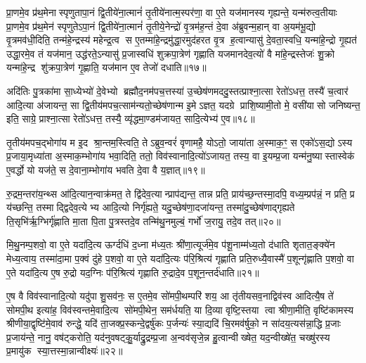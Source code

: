 प्रा॒णमे॒व प्र॑थ॒मेनास्पृणुतापा॒नं द्वि॒तीये॑ना॒त्मानं॑ तृ॒तीये॑नात्म॒स्पर॑णा॒ वा ए॒ते यज॑मानस्य गृह्यन्ते॒ यन्म॑रुत्व॒तीयाः प्रा॒णमे॒व प्र॑थ॒मेन॑ स्पृणुतेऽपा॒नं द्वि॒तीये॑ना॒त्मानं॑ तृ॒तीये॒नेन्द्रो॑ वृ॒त्रम॑ह॒न्तं दे॒वा अ॑ब्रुवन्म॒हान् वा अ॒यम॑भू॒द्यो वृ॒त्रमव॑धी॒दिति॒ तन्म॑हे॒न्द्रस्य॑ महेन्द्र॒त्व स ए॒तम्मा॑हे॒न्द्रमु॑द्धा॒रमुद॑हरत वृ॒त्र ह॒त्वान्यासु॑ दे॒वता॒स्वधि॒ यन्मा॑हे॒न्द्रो गृ॒ह्यत॑ उद्धा॒रमे॒व तं यज॑मान॒ उद्ध॑रते॒ऽन्यासु॑ प्र॒जास्वधि॑ शुक्रपा॒त्रेण॑ गृह्णाति यजमानदेव॒त्यो॑ वै मा॑हे॒न्द्रस्तेजः॑ शु॒क्रो यन्मा॑हे॒न्द्र शु॑क्रपा॒त्रेण॑ गृ॒ह्णाति॒ यज॑मान ए॒व तेजो॑ दधाति॥१७॥

{\anuvakamend[{प्र॒थ॒मेना॑गृह्णीत दे॒वतास्व॒ष्टाविꣳ॑शतिश्च॥५॥}]}

अदि॑तिः पु॒त्रका॑मा सा॒ध्येभ्यो॑ दे॒वेभ्यो ब्रह्मौद॒नम॑पच॒त्तस्या॑ उ॒च्छेष॑णमददु॒स्तत्प्राश्ना॒त्सा रेतो॑ऽधत्त॒ तस्यै॑ च॒त्वार॑ आदि॒त्या अ॑जायन्त॒ सा द्वि॒तीय॑मपच॒त्साम॑न्यतो॒च्छेष॑णान्म इ॒मेऽज्ञत॒ यदग्रे प्राशि॒ष्यामी॒तो मे॒ वसी॑यासो जनिष्यन्त॒ इति॒ साग्रे॒ प्राश्ना॒त्सा रेतो॑ऽधत्त॒ तस्यै॒ व्यृ॑द्धमा॒ण्डम॑जायत॒ सादि॒त्येभ्य॑ ए॒व॥१८॥

तृ॒तीय॑मपच॒द्भोगा॑य म इ॒द श्रा॒न्तम॒स्त्विति॒ तेऽब्रुव॒न्वरं॑ वृणामहै॒ योऽतो॒ जाया॑ता अ॒स्माक॒ꣳ॒ स एको॑ऽस॒द्योऽस्य प्र॒जाया॒मृध्या॑ता अ॒स्माक॒म्भोगा॑य भवा॒दिति॒ ततो॒ विव॑स्वानादि॒त्यो॑ऽजायत॒ तस्य॒ वा इ॒यम्प्र॒जा यन्म॑नु॒ष्यास्तास्वेक॑ ए॒वर्द्धो यो यज॑ते॒ स दे॒वाना॒म्भोगा॑य भवति दे॒वा वै य॒ज्ञात्॥१९॥

रु॒द्रम॒न्तरा॑य॒न्थ्स आ॑दि॒त्यान॒न्वाक्र॑मत॒ ते द्वि॑देव॒त्यान्प्राप॑द्यन्त॒ तान्न प्रति॒ प्राय॑च्छ॒न्तस्मा॒दपि॒ वध्य॒म्प्रप॑न्नं॒ न प्रति॒ प्र य॑च्छन्ति॒ तस्माद्द्विदेव॒त्येभ्य आदि॒त्यो निर्गृ॑ह्यते॒ यदु॒च्छेष॑णा॒दजा॑यन्त॒ तस्मा॑दु॒च्छेष॑णाद्गृह्यते ति॒सृभि॑र्\mbox{}ऋ॒ग्भिर्गृ॑ह्णाति मा॒ता पि॒ता पु॒त्रस्तदे॒व तन्मि॑थु॒नमुल्बं॒ गर्भो॑ ज॒रायु॒ तदे॒व तत्॥२०॥

मि॒थु॒नम्प॒शवो॒ वा ए॒ते यदा॑दि॒त्य ऊर्ग्दधि॑ द॒ध्ना म॑ध्य॒तः श्री॑णा॒त्यूर्ज॑मे॒व प॑शू॒नाम्म॑ध्य॒तो द॑धाति शृतात॒ङ्क्ये॑न मेध्य॒त्वाय॒ तस्मा॑दा॒मा प॒क्वं दु॑हे प॒शवो॒ वा ए॒ते यदा॑दि॒त्यः प॑रि॒श्रित्य॑ गृह्णाति प्रति॒रुध्यै॒वास्मै॑ प॒शून्गृ॑ह्णाति प॒शवो॒ वा ए॒ते यदा॑दि॒त्य ए॒ष रु॒द्रो यद॒ग्निः प॑रि॒श्रित्य॑ गृह्णाति रु॒द्रादे॒व प॒शून॒न्तर्द॑धाति॥२१॥

ए॒ष वै विव॑स्वानादि॒त्यो यदु॑पाशु॒सव॑नः॒ स ए॒तमे॒व सो॑मपी॒थम्परि॑ शय॒ आ तृ॑तीयसव॒नाद्विव॑स्व आदित्यै॒ष ते॑ सोमपी॒थ इत्या॑ह॒ विव॑स्वन्तमे॒वादि॒त्य सो॑मपी॒थेन॒ सम॑र्धयति॒ या दि॒व्या वृष्टि॒स्तया त्वा श्रीणा॒मीति॒ वृष्टि॑कामस्य श्रीणीया॒द्वृष्टि॑मे॒वाव॑ रुन्द्धे॒ यदि॑ ता॒जक्प्र॒स्कन्दे॒द्वर्\mbox{}षु॑कः प॒र्जन्यः॑ स्या॒द्यदि॑ चि॒रमव॑र्\mbox{}षुको॒ न सा॑दय॒त्यस॑न्ना॒द्धि प्र॒जाः प्र॒जाय॑न्ते॒ नानु॒ वष॑ट्करोति॒ यद॑नुवषट्कु॒॒र्याद्रु॒द्रम्प्र॒जा अ॒न्वव॑सृजे॒न्न हु॒त्वान्वीख्षेत॒ यद॒न्वीख्षे॑त॒ चख्षु॑रस्य प्र॒मायु॑क स्या॒त्तस्मा॒न्नान्वीक्ष्यः॑॥२२॥

